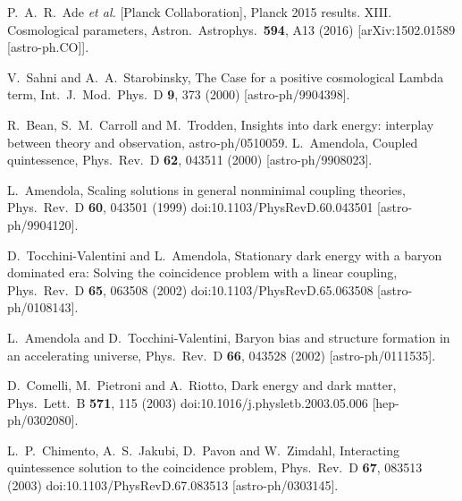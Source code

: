 \documentclass[aps,prd,nofootinbib,amsmath,amssymb,superscriptaddress,twocolumn,10pt]{revtex4}%
\begin{document}
\begin{thebibliography}{99}
  P.~A.~R.~Ade {\it et al.} [Planck Collaboration],
  Planck 2015 results. XIII. Cosmological parameters,
  Astron.\ Astrophys.\  {\bf 594}, A13 (2016)
  [arXiv:1502.01589 [astro-ph.CO]].



  V.~Sahni and A.~A.~Starobinsky,
  The Case for a positive cosmological Lambda term,
  Int.\ J.\ Mod.\ Phys.\ D {\bf 9}, 373 (2000)
  [astro-ph/9904398].

  R.~Bean, S.~M.~Carroll and M.~Trodden,
  Insights into dark energy: interplay between theory and observation,
  astro-ph/0510059.
  L.~Amendola,
  Coupled quintessence,
  Phys.\ Rev.\ D {\bf 62}, 043511 (2000)
[astro-ph/9908023].

  L.~Amendola,
  Scaling solutions in general nonminimal coupling theories,
  Phys.\ Rev.\ D {\bf 60}, 043501 (1999)
  doi:10.1103/PhysRevD.60.043501
  [astro-ph/9904120].

  D.~Tocchini-Valentini and L.~Amendola,
  Stationary dark energy with a baryon dominated era: Solving the coincidence problem with a linear coupling,
  Phys.\ Rev.\ D {\bf 65}, 063508 (2002)
  doi:10.1103/PhysRevD.65.063508
  [astro-ph/0108143].

  L.~Amendola and D.~Tocchini-Valentini,
  Baryon bias and structure formation in an accelerating universe,
  Phys.\ Rev.\ D {\bf 66}, 043528 (2002)
  [astro-ph/0111535].

  D.~Comelli, M.~Pietroni and A.~Riotto,
  Dark energy and dark matter,
  Phys.\ Lett.\ B {\bf 571}, 115 (2003)
  doi:10.1016/j.physletb.2003.05.006
[hep-ph/0302080].

  L.~P.~Chimento, A.~S.~Jakubi, D.~Pavon and W.~Zimdahl,
  Interacting quintessence solution to the coincidence problem,
  Phys.\ Rev.\ D {\bf 67}, 083513 (2003)
  doi:10.1103/PhysRevD.67.083513
  [astro-ph/0303145].


\end{thebibliography}
\end{document}
